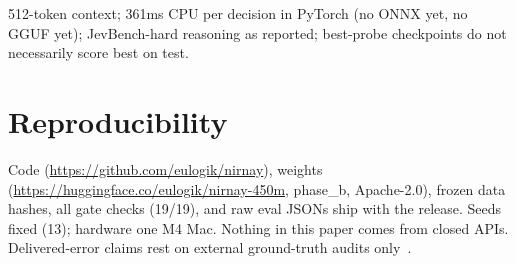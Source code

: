 \documentclass[11pt]{article}
\begin{document}
512-token context; 361ms CPU per decision in PyTorch (no ONNX yet, no GGUF
yet); JevBench-hard reasoning as reported; best-probe checkpoints do not
necessarily score best on test.

\section{Reproducibility}

Code (\url{https://github.com/eulogik/nirnay}), weights
(\url{https://huggingface.co/eulogik/nirnay-450m}, phase\_b, Apache-2.0),
frozen data hashes, all gate checks (19/19), and raw eval JSONs ship with
the release. Seeds fixed (13); hardware one M4 Mac. Nothing in this paper
comes from closed APIs. Delivered-error claims rest on external
ground-truth audits only~\cite{cheap2609}.
\end{document}
